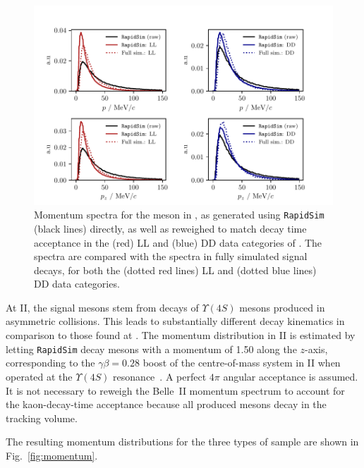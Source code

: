 \begin{figure}[tbp]
    \centering
    \includegraphics[width=0.98\columnwidth]{figures/analysis/systematics/momentum_distributions_rapidsim_vs_lhcb.pdf}
    \caption{Momentum spectra for the \KS meson in \lhcb, as generated using \texttt{RapidSim} (black lines) directly, as well as reweighed to match decay time acceptance in the (red) LL and (blue) DD data categories of \lhcb. The \lhcb spectra are compared with the spectra in fully simulated signal decays, for both the (dotted red lines) LL and (dotted blue lines) DD data categories.}
    \label{fig:rapidsim_momentum_comparison}
\end{figure}

At \belle II, the signal \B mesons stem from decays of $\Upsilon(4S)$ mesons  produced in asymmetric  collisions. This leads to substantially different decay kinematics in comparison to those found at \lhcb. The momentum distribution in \belle II is estimated by letting \texttt{RapidSim} decay \B mesons with a momentum of 1.50 \gevc along the $z$-axis, corresponding to the $\gamma\beta=0.28$ boost of the centre-of-mass system in \belle II when operated at the $\Upsilon(4S)$ resonance~\cite{kouBelleIIPhysics2019}. A perfect $4\pi$ angular acceptance is assumed.   It is not necessary to reweigh the Belle~II momentum spectrum to account for the kaon-decay-time acceptance because all produced \KS mesons decay in the tracking volume. 

The resulting momentum distributions for the three types of sample are shown in Fig.~\ref{fig:momentum}.




